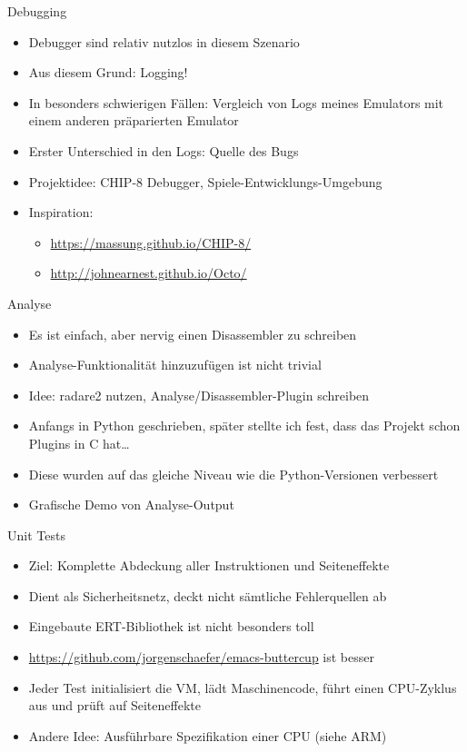 \documentclass[presentation]{beamer}
\begin{document}
\begin{frame}[label={sec:org7852283}]{Debugging}
\begin{itemize}
\item Debugger sind relativ nutzlos in diesem Szenario
\item Aus diesem Grund: Logging!
\item In besonders schwierigen Fällen: Vergleich von Logs meines Emulators
mit einem anderen präparierten Emulator
\item Erster Unterschied in den Logs: Quelle des Bugs
\item Projektidee: CHIP-8 Debugger, Spiele-Entwicklungs-Umgebung
\item Inspiration:
\begin{itemize}
\item \url{https://massung.github.io/CHIP-8/}
\item \url{http://johnearnest.github.io/Octo/}
\end{itemize}
\end{itemize}
\end{frame}

\begin{frame}[label={sec:org2edb1c5}]{Analyse}
\begin{itemize}
\item Es ist einfach, aber nervig einen Disassembler zu schreiben
\item Analyse-Funktionalität hinzuzufügen ist nicht trivial
\item Idee: radare2 nutzen, Analyse/Disassembler-Plugin schreiben
\item Anfangs in Python geschrieben, später stellte ich fest, dass das
Projekt schon Plugins in C hat\ldots{}
\item Diese wurden auf das gleiche Niveau wie die Python-Versionen
verbessert
\item Grafische Demo von Analyse-Output
\end{itemize}
\end{frame}

\begin{frame}[label={sec:org5a85a35}]{Unit Tests}
\begin{itemize}
\item Ziel: Komplette Abdeckung aller Instruktionen und Seiteneffekte
\item Dient als Sicherheitsnetz, deckt nicht sämtliche Fehlerquellen ab
\item Eingebaute ERT-Bibliothek ist nicht besonders toll
\item \url{https://github.com/jorgenschaefer/emacs-buttercup} ist besser
\item Jeder Test initialisiert die VM, lädt Maschinencode, führt einen
CPU-Zyklus aus und prüft auf Seiteneffekte
\item Andere Idee: Ausführbare Spezifikation einer CPU (siehe ARM)
\end{itemize}
\end{frame}
\end{document}
